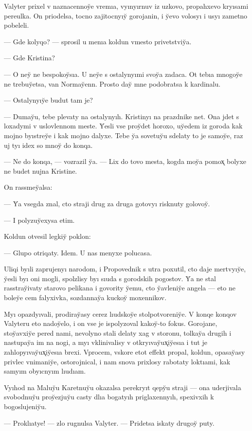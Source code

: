 \documentclass[10pt]{book}
\begin{document}
Valyter prixel v naznacennoy̆e vremıa, vyınyırnuv iz uzkovo, propahxevo kryısami pereulka. On priodelsa, tocno zajitocnyıy̆ gorojanin, i y̆evo volosyı i usyı zametno pobeleli.

— Gde kolyqo? — sprosil u menıa koldun vmesto privetstviy̆a.

— Gde Kristina?

— O ney̆ ne bespokoy̆sıa. U ney̆e s ostalynyımi svoy̆a zadaca. Ot tebıa mnogoy̆e ne trebuy̆etsa, van Normay̆enn. Prosto day̆ mne podobratsa k kardinalu.

— Ostalynyıy̆e budut tam je?

— Dumay̆u, tebe plevaty na ostalynyıh. Kristinyı na prazdnike net. Ona jdet s loxadymi v uslovlennom meste. Y̆esli vse proy̆det horoxo, uy̆edem iz goroda kak mojno byıstrey̆e i kak mojno dalyxe. Tebe y̆a sovetuy̆u sdelaty to je samoy̆e, raz uj tyı idex so mnoy̆ do konqa.

— Ne do konqa, — vozrazil y̆a. — Lix do tovo mesta, kogda moy̆a pomox̨ bolyxe ne budet nujna Kristine.

On rassmey̆alsa:

— Y̆a vsegda znal, cto straji drug za druga gotovyı risknuty golovoy̆.

— I polyzuy̆exysa etim.

Koldun otvesil legkiy̆ poklon:

— Glupo otriqaty. Idem. U nas menyxe polucasa.

Uliqi byıli zaprujenyı narodom, i Propovednik s utra poxutil, cto daje mertvyıy̆e, y̆esli byı oni mogli, spolzlisy byı sıuda s gorodskih pogostov. Y̆a ne stal rasstray̆ivaty starovo pelikana i govority y̆emu, cto y̆avleniy̆e angela — eto ne boley̆e cem falyxivka, sozdannay̆a kuckoy̆ moxennikov.

Myı opazdyıvali, prodiray̆asy cerez lıudskoy̆e stolpotvoreniy̆e. V konqe konqov Valyteru eto nadoy̆elo, i on vse je ispolyzoval kakoy̆-to fokus. Gorojane, stoy̆avxiy̆e pered nami, nevolyno stali delaty xag v storonu, tolkay̆a drugih i nastupay̆a im na nogi, a myı vklinivalisy v otkryıvay̆ux̨iy̆esıa i tut je zahlopyıvay̆ux̨iy̆esıa brexi. Vprocem, vskore etot effekt propal, koldun, opasay̆asy privlec vnimaniy̆e, ostorojnical, i nam snova prixlosy rabotaty loktıami, kak samyım obyıcnyım lıudıam.

Vyıhod na Maluy̆u Karetnuy̆u okazalsa perekryıt qepy̆u straji — ona uderjivala svobodnuy̆u proy̆ezjuy̆u casty dlıa bogatyıh priglaxennyıh, spexivxih k bogoslujeniy̆u.

— Proklıatye! — zlo rugnulsa Valyter. — Pridetsa iskaty drugoy̆ puty.
\end{document}
